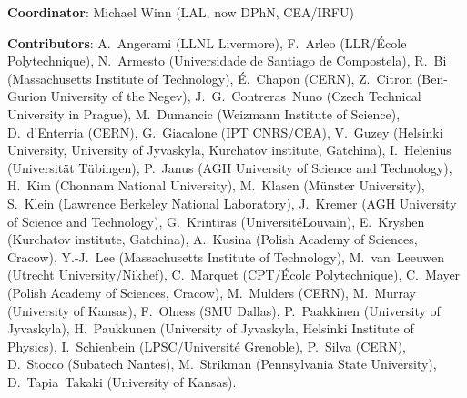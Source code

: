 { \small
\noindent \textbf{Coordinator}: Michael Winn (LAL, now DPhN, CEA/IRFU) %

\noindent \textbf{Contributors}:
A.~Angerami (LLNL Livermore), %
F.~Arleo (LLR/{\'E}cole Polytechnique), %
N.~Armesto (Universidade de Santiago de Compostela), %
R.~Bi (Massachusetts Institute of Technology), %
{\'E}.~Chapon (CERN), %
Z.~Citron (Ben-Gurion University of the Negev), %
J.~G.~Contreras~Nuno (Czech Technical University in Prague),  %
M.~Dumancic (Weizmann Institute of Science),
D.~d'Enterria (CERN), %
G.~Giacalone (IPT CNRS/CEA), %
V.~Guzey (Helsinki University, University of Jyvaskyla, Kurchatov institute, Gatchina),%
I.~Helenius (Universit\"{a}t T\"{u}bingen), %
P.~Janus (AGH University of Science and Technology),
H.~Kim (Chonnam National University), 
M.~Klasen (M\"{u}nster University), %
S.~Klein (Lawrence Berkeley National Laboratory), %
J.~Kremer (AGH University of Science and Technology),
G.~Krintiras (Universit\'{e}Louvain),
E.~Kryshen (Kurchatov institute, Gatchina), %
A.~Kusina (Polish Academy of Sciences, Cracow), %
Y.-J.~Lee (Massachusetts Institute of Technology), %
M.~van~Leeuwen (Utrecht University/Nikhef), %
C.~Marquet (CPT/{\'E}cole Polytechnique), %
C.~Mayer (Polish Academy of Sciences, Cracow), %
M.~Mulders (CERN),
M.~Murray (University of Kansas), %
F.~Olness (SMU Dallas), %
P.~Paakkinen (University of Jyvaskyla), %
H.~Paukkunen (University of Jyvaskyla, Helsinki Institute of Physics), %
I.~Schienbein (LPSC/Universit{\'e} Grenoble),
P.~Silva (CERN), %
D.~Stocco (Subatech Nantes), %
M.~Strikman (Pennsylvania State University), %
D.~Tapia~Takaki (University of Kansas). %
}

